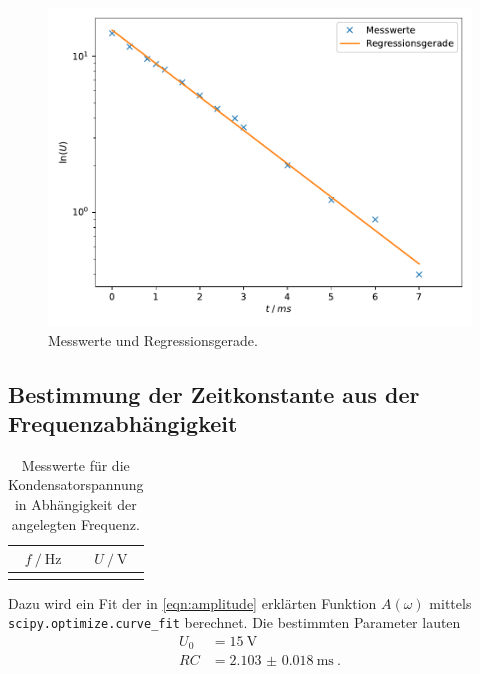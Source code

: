 \begin{figure}
    \centering
    \includegraphics[width=\textwidth]{build/plt/1_rc_via_t.pdf}
    \caption{Messwerte und Regressionsgerade.}
    \label{fig:1_rc_via_t}
\end{figure}

\clearpage
\subsection{Bestimmung der Zeitkonstante aus der Frequenzabhängigkeit}
\label{auswertung:2}

\begin{table}
  \centering
  \caption{Messwerte für die Kondensatorspannung in Abhängigkeit der angelegten Frequenz.}
  \label{tab:mess_2}
  \begin{tabular}{S[table-format=4.0] S[table-format=2.1]}
  \toprule
  $f \mathbin{/} \si{\hertz}$ &
  $U \mathbin{/} \si{\volt}$ \\
  \midrule
  \bottomrule
  \end{tabular}
\end{table}

Dazu wird ein Fit der in \autoref{eqn:amplitude} erklärten Funktion $A(\omega)$
mittels \texttt{scipy.optimize.curve\_fit} berechnet.
Die bestimmten Parameter lauten
\begin{align*}
  U_0 &= \SI{15}{\volt} \\
  RC &= \SI{2.103(18)}{\milli\second} \ .
\end{align*}

